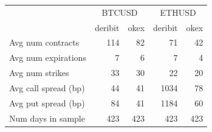 \begin{tabular}{lrrrr}
\toprule
 & \multicolumn{2}{c}{BTCUSD} & \multicolumn{2}{c}{ETHUSD} \\
 & deribit & okex & deribit & okex \\
\midrule
Avg num contracts & 114 & 82 & 71 & 42 \\
Avg num expirations & 7 & 6 & 7 & 4 \\
Avg num strikes & 33 & 30 & 22 & 20 \\
Avg call spread (bp) & 44 & 41 & 1034 & 78 \\
Avg put spread (bp) & 84 & 41 & 1184 & 60 \\
Num days in sample & 423 & 423 & 423 & 423 \\
\bottomrule
\end{tabular}
